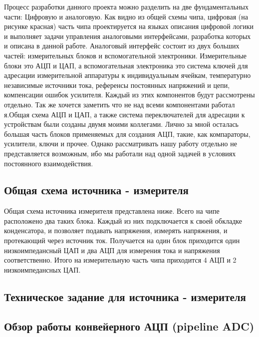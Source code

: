 \documentclass[a4paper,12pt]{article} %
\begin{document}
Процесс разработки данного проекта  можно разделить на две фундаментальных части: Цифровую и аналоговую. Как видно из общей схемы чипа, цифровая (на рисунке красная) часть чипа проектируется на языках описания цифровой логики и выполняет задачи управления аналоговыми интерфейсами, разработка которых и описана в данной работе. Аналоговый интерфейс состоит из  двух больших частей: измерительных блоков и вспомогательной электроники. Измерительные блоки это АЦП и ЦАП, а вспомогательная электроника это система ключей для адресации измерительной аппаратуры к индивидуальным ячейкам, температурно независимые источники тока, референсы постоянных напряжений и цепи, компенсации ошибок усилителя. Каждый из этих компонентов будут рассмотрены отдельно. Так же хочется заметить что не над всеми компонентами работал я.Общая схема АЦП и ЦАП, а также система переключателей для адресации к устройствам были созданы двумя моими коллегами. Лично за мной осталась большая часть блоков применяемых для создания АЦП, такие, как компараторы, усилители, ключи и прочее. Однако рассматривать нашу работу отдельно не представляется возможным, ибо мы работали над одной задачей в условиях постоянного взаимодействия.



\subsection{Общая схема источника - измерителя}


Общая схема источника измерителя представлена ниже. Всего на чипе расположено два таких блока. Каждый из них подключается к своей обкладке конденсатора, и позволяет подавать напряжения, измерять напряжения, и протекающий через источник ток. Получается на один блок приходится один низкоимпедансный ЦАП и два АЦП для измерения тока и напряжения соответственно. Итого на измерительную часть чипа приходится 4 АЦП и 2 низкоимпедансных ЦАП.





\subsection{Техническое задание для  источника - измерителя}

\subsection{Обзор работы конвейерного АЦП (pipeline ADC)}
\end{document}
